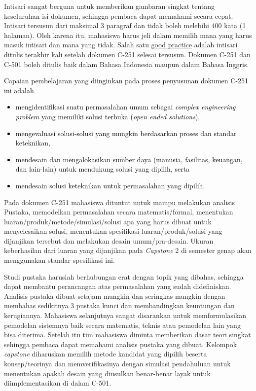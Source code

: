 
Intisari sangat berguna untuk memberikan gambaran singkat tentang keseluruhan isi dokumen, sehingga pembaca dapat memahami secara cepat. Intisari tersusun dari maksimal 3 paragraf dan tidak boleh melebihi 400 kata (1 halaman). Oleh karena itu, mahasiswa harus jeli dalam memilih mana yang harus masuk intisari dan mana yang tidak. Salah satu \underline{good practice} adalah intisari ditulis terakhir kali setelah dokumen C-251 selesai tersusun. Dokumen C-251 dan C-501 boleh ditulis baik dalam Bahasa Indonesia maupun dalam Bahasa Inggris.

\textcolor{black}{Capaian pembelajaran yang diinginkan pada proses penyusunan dokumen C-251 ini adalah
\begin{itemize}
    \item mengidentifikasi suatu permasalahan umum sebagai \textit{complex engineering problem} yang memiliki solusi terbuka (\textit{open ended solutions}),
    \item mengevaluasi solusi-solusi yang mungkin berdasarkan proses dan standar keteknikan, 
    \item  mendesain dan mengalokasikan sumber daya (manusia, fasilitas, keuangan, dan lain-lain) untuk mendukung solusi yang dipilih, serta
    \item mendesain solusi keteknikan untuk permasalahan yang dipilih.
\end{itemize}
}

Pada dokumen C-251 mahasiswa dituntut untuk mampu melakukan analisis Pustaka, memodelkan permasalahan secara matematis/formal, menentukan luaran/produk/metode/simulasi/solusi apa yang harus dibuat untuk menyelesaikan solusi, menentukan spesifikasi luaran/produk/solusi yang dijanjikan tersebut dan melakukan desain umum/pra-desain. Ukuran keberhasilan dari luaran yang dijanjikan pada \textit{Capstone} 2 di semester genap akan menggunakan standar spesifikasi ini. 

Studi pustaka haruslah berhubungan erat dengan topik yang dibahas, sehingga dapat membantu perancangan atas permasalahan yang sudah didefiniskan. Analisis pustaka dibuat setajam mungkin dan seringkas mungkin dengan membahas sedikitnya 3 pustaka kunci dan membandingkan keuntungan dan kerugiannya. Mahasiswa selanjutnya sangat disarankan untuk memformulasikan pemodelan sistemnya baik secara matematis, teknis atau pemodelan lain yang bisa diterima. Setelah itu tim mahasiswa diminta memberikan dasar teori singkat sehingga pembaca dapat memahami analisis pustaka yang dibuat. Kelompok \textit{capstone} diharuskan memilih metode kandidat yang dipilih beserta konsep/teorinya dan memverifikasinya dengan simulasi pendahuluan untuk menentukan apakah desain yang diusulkan benar-benar layak untuk diimplementasikan di dalam C-501. 

